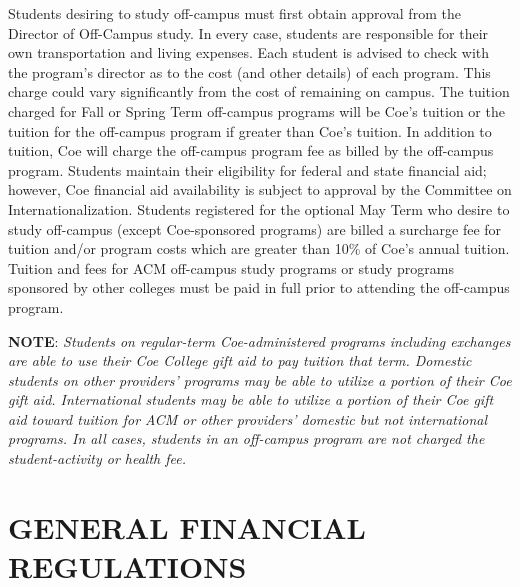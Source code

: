 \documentclass[
  letterpaper,
]{scrbook}
\begin{document}
Students desiring to study off-campus must first obtain approval from
the Director of Off-Campus study. In every case, students are
responsible for their own transportation and living expenses. Each
student is advised to check with the program's director as to the cost
(and other details) of each program. This charge could vary
significantly from the cost of remaining on campus. The tuition charged
for Fall or Spring Term off-campus programs will be Coe's tuition or the
tuition for the off-campus program if greater than Coe's tuition. In
addition to tuition, Coe will charge the off-campus program fee as
billed by the off-campus program. Students maintain their eligibility
for federal and state financial aid; however, Coe financial aid
availability is subject to approval by the Committee on
Internationalization. Students registered for the optional May Term who
desire to study off-campus (except Coe-sponsored programs) are billed a
surcharge fee for tuition and/or program costs which are greater than
10\% of Coe's annual tuition. Tuition and fees for ACM off-campus study
programs or study programs sponsored by other colleges must be paid in
full prior to attending the off-campus program.

\textbf{NOTE}: \emph{Students on regular-term Coe-administered programs
including exchanges are able to use their Coe College gift aid to pay
tuition that term. Domestic students on other providers' programs may be
able to utilize a portion of their Coe gift aid. International students
may be able to utilize a portion of their Coe gift aid toward tuition
for ACM or other providers' domestic but not international programs. In
all cases, students in an off-campus program are not charged the
student-activity or health fee.}

\hypertarget{general-financial-regulations}{%
\section{GENERAL FINANCIAL
REGULATIONS}\label{general-financial-regulations}}
\end{document}
